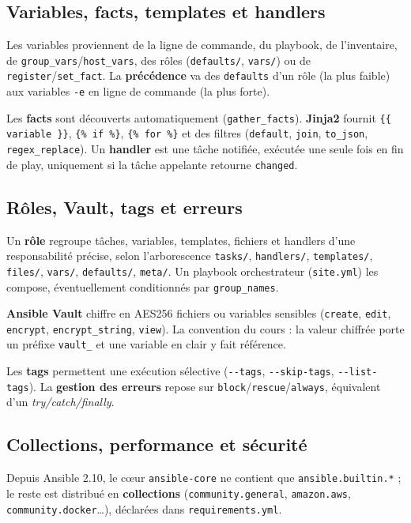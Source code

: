 \documentclass[11pt,a4paper]{article}
\begin{document}
\subsection{Variables, facts, templates et handlers}
Les variables proviennent de la ligne de commande, du playbook, de l'inventaire, de
\texttt{group\_vars}/\allowbreak\texttt{host\_vars}, des rôles (\texttt{defaults/}, \texttt{vars/}) ou de
\texttt{register}/\allowbreak\texttt{set\_fact}. La \textbf{précédence} va des \texttt{defaults} d'un rôle
(la plus faible) aux variables \texttt{-e} en ligne de commande (la plus forte).

Les \textbf{facts} sont découverts automatiquement (\texttt{gather\_facts}). \textbf{Jinja2} fournit
\verb|{{ variable }}|, \verb|{% if %}|, \verb|{% for %}| et des filtres (\texttt{default}, \texttt{join},
\texttt{to\_json}, \texttt{regex\_replace}). Un \textbf{handler} est une tâche notifiée, exécutée une seule
fois en fin de play, uniquement si la tâche appelante retourne \texttt{changed}.

\subsection{Rôles, Vault, tags et erreurs}
Un \textbf{rôle} regroupe tâches, variables, templates, fichiers et handlers d'une responsabilité précise,
selon l'arborescence \texttt{tasks/}, \texttt{handlers/}, \texttt{templates/}, \texttt{files/},
\texttt{vars/}, \texttt{defaults/}, \texttt{meta/}. Un playbook orchestrateur (\texttt{site.yml}) les
compose, éventuellement conditionnés par \texttt{group\_names}.

\textbf{Ansible Vault} chiffre en AES256 fichiers ou variables sensibles
(\texttt{create}, \texttt{edit}, \texttt{encrypt}, \texttt{encrypt\_string}, \texttt{view}). La convention
du cours : la valeur chiffrée porte un préfixe \texttt{vault\_} et une variable en clair y fait référence.

Les \textbf{tags} permettent une exécution sélective (\texttt{-{}-tags}, \texttt{-{}-skip-tags},
\texttt{-{}-list-tags}). La \textbf{gestion des erreurs} repose sur \texttt{block}/\texttt{rescue}/\texttt{always},
équivalent d'un \emph{try/catch/finally}.

\subsection{Collections, performance et sécurité}
Depuis Ansible 2.10, le c\oe{}ur \texttt{ansible-core} ne contient que \texttt{ansible.builtin.*} ; le reste
est distribué en \textbf{collections} (\texttt{community.general}, \texttt{amazon.aws},
\texttt{community.docker}\dots{}), déclarées dans \texttt{requirements.yml}.
\end{document}
